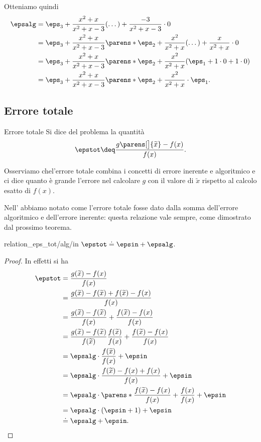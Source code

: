 \begin{example}
    Otteniamo quindi \begin{align*}
        \epsalg &= \eps_3 + \frac{x^2 + x}{x^2+x-3}(\dots) + \frac{-3}{x^2+x-3}\cdot 0\\
        &= \eps_3 + \frac{x^2 + x}{x^2+x-3}\parens*{\eps_2 + \frac{x^2}{x^2+x}(\dots) + \frac{x}{x^2+x}\cdot 0}\\
        &= \eps_3 + \frac{x^2 + x}{x^2+x-3} \parens*{\eps_2 + \frac{x^2}{x^2+x}(\eps_1 + 1\cdot 0 + 1 \cdot 0)}\\
        &= \eps_3 + \frac{x^2 + x}{x^2+x-3} \parens*{\eps_2 + \frac{x^2}{x^2+x} \cdot \eps_1}.
    \end{align*}
\end{example}

\subsection{Errore totale}

\begin{definition}
    {Errore totale}{}
        Si dice  del problema la quantità \[
            \epstot \deq \frac{g\parens[\big]{\tilde x} - f(x)}{f(x)}.
        \]
\end{definition}

Osserviamo chel'errore totale combina i concetti di errore inerente e algoritmico e ci dice quanto è grande l'errore nel calcolare $g$ con il valore di $\tilde x$ rispetto al calcolo esatto di $f(x)$.


Nell' abbiamo notato come l'errore totale fosse dato dalla somma dell'errore algoritmico e dell'errore inerente: questa relazione vale sempre, come dimostrato dal prossimo teorema.

\begin{theorem}{}{relation_eps_tot/alg/in}
    $\epstot \doteq \epsin + \epsalg$.
\end{theorem}
\begin{proof}
    In effetti si ha \begin{align*}
        \epstot &= \frac{g(\tilde x) - f(x)}{f(x)}\\
        &= \frac{g(\tilde x) - f(\tilde x) + f(\tilde x) - f(x)}{f(x)} \\ %
        &= \frac{g(\tilde x) - f(\tilde x)}{f(x)} + \frac{f(\tilde x) - f(x)}{f(x)}\\
        &= \frac{g(\tilde x) - f(\tilde x)}{f(\tilde x)}\frac{f(\tilde x)}{f(x)} + \frac{f(\tilde x) - f(x)}{f(x)}\\
        &= \epsalg \cdot \frac{f(\tilde x)}{f(x)} + \epsin\\
        &= \epsalg \cdot \frac{f(\tilde x) - f(x) + f(x)}{f(x)} + \epsin\\
        &= \epsalg \cdot \parens*{ \frac{f(\tilde x) - f(x)}{f(x)} + \frac{f(x)}{f(x)} } + \epsin\\
        &= \epsalg \cdot (\epsin + 1) + \epsin\\
        &\doteq \epsalg + \epsin. \qedhere
    \end{align*}
\end{proof}

